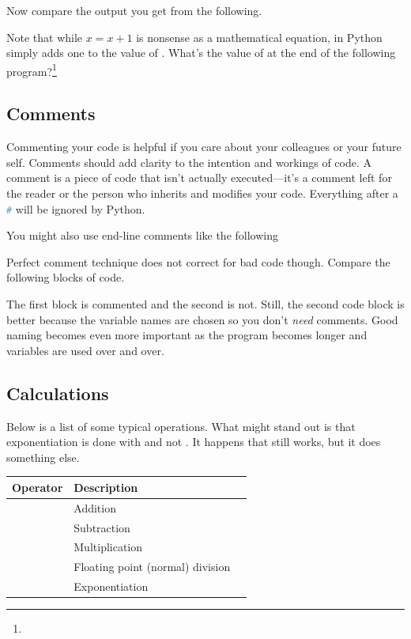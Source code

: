 \documentclass{article}
\begin{document}
\smallskip


\smallskip
\noindent Now compare the output you get from the following.


\noindent Note that while $x = x+1$ is nonsense as a mathematical equation, in Python  simply adds one to the value of . What's the value of  at the end of the following program?\footnote{}


\subsection{Comments}
Commenting your code is helpful if you care about your colleagues or your future self. Comments should add clarity to the intention and workings of code. A comment is a piece of code that isn't actually executed---it's a comment left for the reader or the person who inherits and modifies your code.
Everything after a \lstinline[language = Python]{#} will be ignored by Python.


\smallskip
 \noindent You might also use end-line comments like the following



\smallskip

\noindent Perfect comment technique does not correct for bad code though. Compare the following blocks of code. 



The first block is commented and the second is not. Still, the second code block is better because the variable names are chosen so you don't \emph{need} comments. Good naming becomes even more important as the program becomes longer and variables are used over and over. 



\subsection{Calculations}
Below is a list of some typical operations. What might stand out is that exponentiation is done with \code{**} and not \code{^}. It happens that \code{^} still works, but it does something else. 


\begin{center}
{\setlength{\tabcolsep}{2em}
\begin{tabular}{lll}
\toprule
Operator & Description \\
\midrule
\code{+} &    Addition \\
\code{-} & Subtraction \\
\code{*}  &    Multiplication \\
\code{/}  &   Floating point (normal) division \\
\code{**} & Exponentiation \\
\bottomrule
\end{tabular}}
\end{center}
\end{document}
